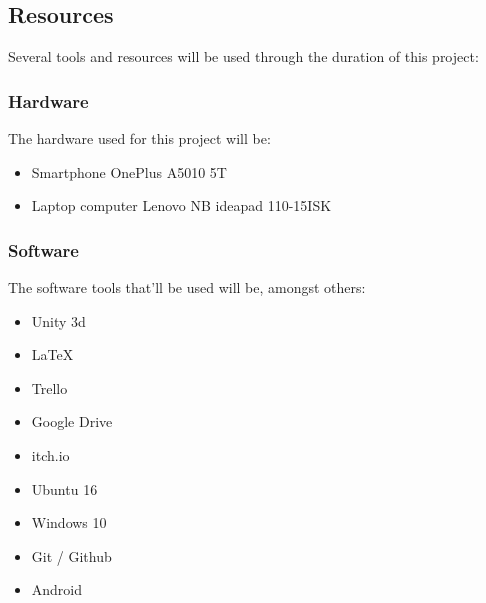 \subsection{Resources}

Several tools and resources will be used through the duration of this project:

\subsubsection{Hardware}

The hardware used for this project will be:

\begin{itemize}
    \item Smartphone OnePlus A5010 5T 
    \item Laptop computer Lenovo NB ideapad 110-15ISK
\end{itemize}

\subsubsection{Software}

The software tools that'll be used will be, amongst others:

\begin{itemize}
    \item Unity 3d
    \item LaTeX
    \item Trello
    \item Google Drive
    \item itch.io
    \item Ubuntu 16
    \item Windows 10
    \item Git / Github
    \item Android
\end{itemize}


